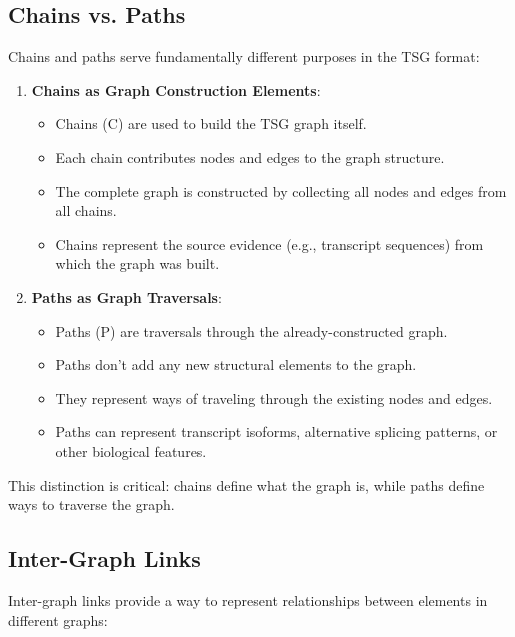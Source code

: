 \documentclass[11pt,a4paper]{article}
\begin{document}
\subsection{Chains vs. Paths}

Chains and paths serve fundamentally different purposes in the TSG format:

\begin{enumerate}[leftmargin=*]
	\item \textbf{Chains as Graph Construction Elements}:
	      \begin{itemize}
		      \item Chains (C) are used to build the TSG graph itself.
		      \item Each chain contributes nodes and edges to the graph structure.
		      \item The complete graph is constructed by collecting all nodes and edges from all chains.
		      \item Chains represent the source evidence (e.g., transcript sequences) from which the graph was built.
	      \end{itemize}

	\item \textbf{Paths as Graph Traversals}:
	      \begin{itemize}
		      \item Paths (P) are traversals through the already-constructed graph.
		      \item Paths don't add any new structural elements to the graph.
		      \item They represent ways of traveling through the existing nodes and edges.
		      \item Paths can represent transcript isoforms, alternative splicing patterns, or other biological features.
	      \end{itemize}
\end{enumerate}

This distinction is critical: chains define what the graph is, while paths define ways to traverse the graph.

\subsection{Inter-Graph Links}

Inter-graph links provide a way to represent relationships between elements in different graphs:
\end{document}
